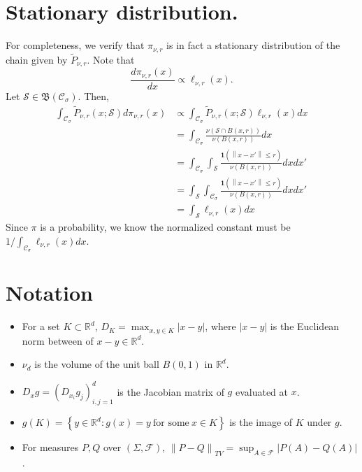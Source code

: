 \documentclass{article}
\newcommand{\Reals}{\mathbb{R}}
\newcommand{\norm}[1]{\left\lVert#1\right\rVert}
\newcommand{\abs}[1]{\left \lvert #1 \right \rvert}
\newcommand{\set}[1]{\left\{#1\right\}}
\newcommand{\Rd}{\Reals^d}
\newcommand{\Cset}{\mathcal{C}}
\newcommand{\Sset}{\mathcal{S}}
\newcommand{\Csig}{\Cset_{\sigma}}
\newcommand{\1}{\mathbf{1}}
\theoremstyle{alden}
\theoremstyle{aldenthm}
\theoremstyle{remark}
\begin{document}
\section{Stationary distribution.}
\label{sec: stationary_distribution}
For completeness, we verify that $\pi_{\nu,r}$ is in fact a stationary distribution of the chain given by $\widetilde{P}_{\nu,r}$. Note that
\begin{equation*}
\frac{d \pi_{\nu,r}(x)}{dx} \propto \ell_{\nu,r}(x).
\end{equation*}
Let $\Sset \in \mathfrak{B}(\Csig)$. Then, 
\begin{align*}
\int_{\Csig} \widetilde{P}_{\nu,r}(x; \Sset) d \pi_{\nu,r}(x) & \propto \int_{\Csig} \widetilde{P}_{\nu,r}(x; \Sset) \ell_{\nu,r}(x) dx \\
& = \int_{\Csig} \frac{\nu(\Sset \cap B(x,r))}{\nu(B(x,r))} dx \\
& = \int_{\Csig} \int_{\Sset} \frac{\1(\norm{x - x'} \leq r)}{\nu(B(x,r))} dx dx' \\
& = \int_{\Sset} \int_{\Csig} \frac{\1(\norm{x - x'} \leq r)}{\nu(B(x,r))} dx dx' \\
& = \int_{\Sset} \ell_{\nu,r}(x) dx
\end{align*}
Since $\pi$ is a probability, we know the normalized constant must be $1 / \int_{\Csig} \ell_{\nu,r}(x) dx$. 

\section{Notation}
\begin{itemize}
	\item For a set $K \subset \Rd$, $D_K = \max_{x,y \in K} \abs{x - y}$, where $\abs{x - y}$ is the Euclidean norm between of $x - y \in \Rd$. 
	\item $\nu_d$ is the volume of the unit ball $B(0,1)$ in $\Rd$. 
	\item $D_x g = (D_{x_i} {g_j})_{i,j = 1}^{d}$ is the Jacobian matrix of $g$ evaluated at $x$.
	\item $g(K) = \set{y \in \Rd: g(x) = y ~\text{for some}~ x \in K}$ is the image of $K$ under $g$.
	\item For measures $P,Q$ over $(\Sigma, \mathcal{F})$, $\norm{P - Q}_{TV} = \sup_{A \in \mathcal{F}} \abs{P(A) - Q(A)}$.  
\end{itemize}

\clearpage



\end{document}
